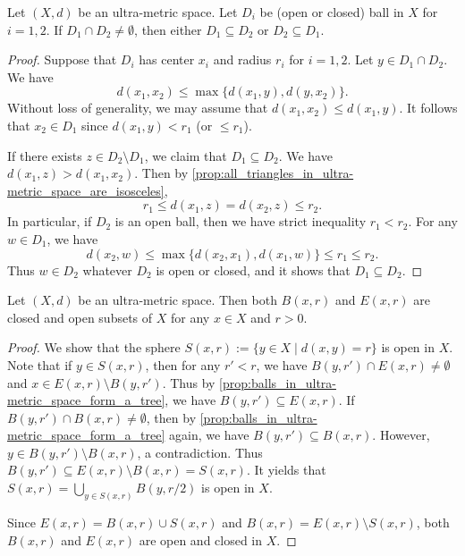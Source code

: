     \begin{proposition}\label{prop:balls_in_ultra-metric_space_form_a_tree}
        Let \((X,d)\) be an ultra-metric space.
        Let \(D_i\) be (open or closed) ball in \(X\) for \(i=1,2\).
        If \(D_1 \cap D_2 \neq \emptyset\), then either \(D_1 \subseteq D_2\) or \(D_2 \subseteq D_1\).
    \end{proposition}
    \begin{proof}
        Suppose that \(D_i\) has center \(x_i\) and radius \(r_i\) for \(i=1,2\).
        Let \(y \in D_1 \cap D_2\).
        We have 
        \[ d(x_1,x_2) \leq \max\{d(x_1,y), d(y,x_2)\}. \]
        Without loss of generality, we may assume that \(d(x_1,x_2) \leq d(x_1,y)\).
        It follows that \(x_2 \in D_1\) since \(d(x_1,y) < r_1\) (or \(\leq r_1\)).

        If there exists \(z \in D_2 \setminus D_1\), we claim that \(D_1 \subseteq D_2\).
        We have \(d(x_1,z) > d(x_1,x_2)\).
        Then by \cref{prop:all_triangles_in_ultra-metric_space_are_isosceles},
        \[ r_1 \leq d(x_1,z) = d(x_2,z) \leq r_2. \]
        In particular, if \(D_2\) is an open ball, then we have strict inequality \(r_1 < r_2\).
        For any \(w \in D_1\), we have 
        \[ d(x_2,w) \leq \max\{d(x_2,x_1), d(x_1,w)\} \leq r_1 \leq r_2. \]
        Thus \(w \in D_2\) whatever \(D_2\) is open or closed, and it shows that \(D_1 \subseteq D_2\).
    \end{proof}

    \begin{proposition}\label{prop:all_balls_in_ultra-metric_space_are_clopen}
        Let \((X,d)\) be an ultra-metric space.
        Then both \(B(x,r)\) and \(E(x,r)\) are closed and open subsets of \(X\) for any \(x \in X\) and \(r > 0\).
    \end{proposition}
    \begin{proof}
        We show that the sphere \(S(x,r) := \{y \in X \mid d(x,y) = r\}\) is open in \(X\).
        Note that if \(y \in S(x,r)\), then for any \(r' < r\), we have \(B(y,r') \cap E(x,r) \neq \emptyset\) and \(x \in E(x,r) \setminus B(y,r')\).
        Thus by \cref{prop:balls_in_ultra-metric_space_form_a_tree}, we have \(B(y,r') \subseteq E(x,r)\).
        If \(B(y,r') \cap B(x,r) \neq \emptyset\), then by \cref{prop:balls_in_ultra-metric_space_form_a_tree} again, we have \(B(y,r') \subseteq B(x,r)\).
        However, \(y \in B(y,r') \setminus B(x,r)\), a contradiction.
        Thus \(B(y,r') \subseteq E(x,r) \setminus B(x,r) = S(x,r)\).
        It yields that \(S(x,r) = \bigcup_{y \in S(x,r)} B(y,r/2)\) is open in \(X\).

        Since \(E(x,r) = B(x,r) \cup S(x,r)\) and \(B(x,r) = E(x,r) \setminus S(x,r)\), both \(B(x,r)\) and \(E(x,r)\) are open and closed in \(X\).
    \end{proof}

